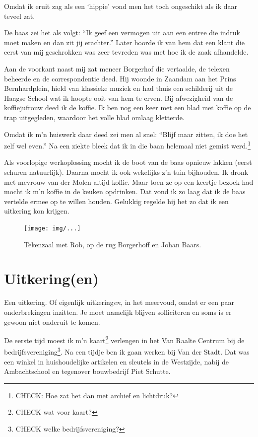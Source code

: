 \documentclass[12pt,twoside, openright]{memoir}
\begin{document}
Omdat ik eruit zag als een `hippie' vond men het toch ongeschikt als ik daar teveel zat.

De baas zei het als volgt: ``Ik geef een vermogen uit aan een entree die indruk moet maken en dan zit jij erachter.'' Later hoorde ik van hem dat een klant die eerst van mij geschrokken was zeer tevreden was met hoe ik de zaak afhandelde.

Aan de voorkant naast mij zat meneer Borgerhof die vertaalde, de telexen beheerde en de correspondentie deed. Hij woonde in Zaandam aan het Prins Bernhardplein, hield van klassieke muziek en had thuis een schilderij uit de Haagse School wat ik hoopte ooit van hem te erven. Bij afwezigheid van de koffiejufrouw deed ik de koffie. Ik ben nog een keer met een blad met koffie op de trap uitgegleden, waardoor het volle blad omlaag kletterde.

Omdat ik m'n huiswerk daar deed zei men al snel: ``Blijf maar zitten, ik doe het zelf wel even.'' Na een ziekte bleek dat ik in die baan helemaal niet gemist werd.\footnote{CHECK: Hoe zat het dan met archief en lichtdruk?} 

Als voorlopige werkoplossing mocht ik de boot van de baas opnieuw lakken (eerst schuren natuurlijk). Daarna mocht ik ook wekelijks z’n tuin bijhouden. Ik dronk met mevrouw van der Molen altijd koffie. Maar toen ze op een keertje bezoek had mocht ik m’n koffie in de keuken opdrinken. Dat vond ik zo laag dat ik de baas vertelde ermee op te willen houden. Gelukkig regelde hij het zo dat ik een uitkering kon krijgen. 

\begin{figure}[t]
\texttt{[image: img/...]}
\caption{Tekenzaal met Rob, op de rug Borgerhoff en Johan Baars.}
\end{figure}

\chapter{Uitkering(en)} %
\label{cha:uitkering_en}

Een uitkering. Of eigenlijk uitkering\emph{en}, in het meervoud, omdat er een paar onderbrekingen inzitten. Je moet namelijk blijven solliciteren en soms is er gewoon niet onderuit te komen. 

De eerste tijd moest ik m'n kaart\footnote{CHECK wat voor kaart?} verlengen in het Van Raalte Centrum bij de bedrijfsvereniging\footnote{CHECK welke bedrijfsvereniging?}. Na een tijdje ben ik gaan werken bij Van der Stadt. Dat was een winkel in huishoudelijke artikelen en sleutels in de Westzijde, nabij de Ambachtschool en tegenover bouwbedrijf Piet Schutte.
\end{document}
